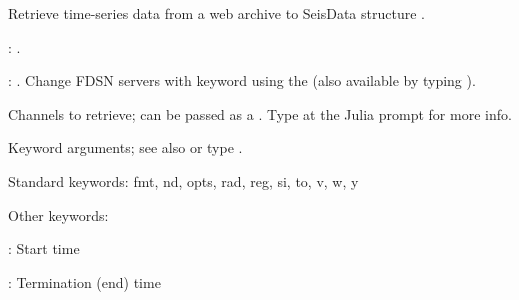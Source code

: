 \documentclass[letterpaper,11pt,english]{sphinxmanual}
\begin{document}
\begin{fulllineitems}
\end{fulllineitems}



\begin{fulllineitems}
\end{fulllineitems}


\begin{DUlineblock}{0em}
\item[] Retrieve time-series data from a web archive to SeisData structure .
\item[] 
\item[] 
\item[] : {\hyperref[\detokenize{src/Web/webclients:irisws}]{}}.
\item[] : {\hyperref[\detokenize{src/Web/webclients:fdsnws}]{}}. Change FDSN servers with keyword  using the {\hyperref[\detokenize{src/Appendices/web_syntax:servers}]{}} (also available by typing ).
\item[] 
\item[] 
\item[] Channels to retrieve; can be passed as a {\hyperref[\detokenize{src/Appendices/web_syntax:cid}]{}}. Type  at the Julia prompt for more info.
\item[] 
\item[] 
\item[] Keyword arguments; see also {\hyperref[\detokenize{src/Appendices/keywords:dkw}]{}} or type .
\item[] Standard keywords: fmt, nd, opts, rad, reg, si, to, v, w, y
\item[] Other keywords:
\item[] : Start time
\item[] : Termination (end) time
\end{DUlineblock}
\end{document}
